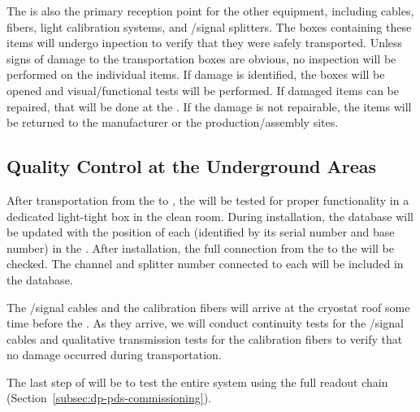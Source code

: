 The  is also the primary reception point for the other   equipment, including cables, fibers, light calibration systems, and /signal splitters. The boxes containing these items will undergo inpection to verify that %
they were safely transported. Unless signs of  damage to the transportation boxes are obvious, no  inspection will be performed on the individual items. If  damage is identified, the boxes will be opened and visual/functional  tests will be performed. If damaged items can be repaired, that will be done at the . If the damage is not repairable, the items will be returned to the manufacturer or the production/assembly sites.

\subsection{Quality Control at the Underground Areas}

After  transportation from the  to , the  will be tested for proper functionality in a dedicated light-tight box in the clean room. During installation, the  database will be updated with the position of each  (identified by its serial number and base number) in the . After installation, the full connection from the  to the  will be checked. The  channel and splitter number connected to each  will be included in the  database.

The /signal cables and the calibration fibers will arrive %
at the cryostat roof %
some time before the . %
As they arrive, we will conduct %
continuity tests for the /signal cables and qualitative transmission tests for the calibration fibers to verify that no damage occurred during transportation.

The last step of  will be to test the entire system using the full readout chain (Section~\ref{subsec:dp-pds-commissioning}).
